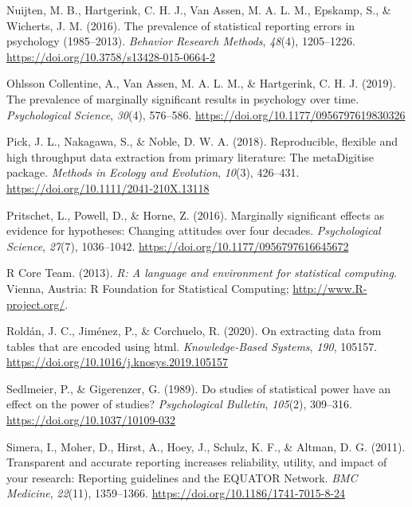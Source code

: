 \documentclass[
  12pt,
]{article}
\begin{document}
\leavevmode\hypertarget{ref-Nuijten2016}{}%
Nuijten, M. B., Hartgerink, C. H. J., Van Assen, M. A. L. M., Epskamp,
S., \& Wicherts, J. M. (2016). The prevalence of statistical reporting
errors in psychology (1985--2013). \emph{Behavior Research Methods},
\emph{48}(4), 1205--1226.
\url{https://doi.org/10.3758/s13428-015-0664-2}

\leavevmode\hypertarget{ref-OhlssonCollentine}{}%
Ohlsson Collentine, A., Van Assen, M. A. L. M., \& Hartgerink, C. H. J.
(2019). The prevalence of marginally significant results in psychology
over time. \emph{Psychological Science}, \emph{30}(4), 576--586.
\url{https://doi.org/10.1177/0956797619830326}

\leavevmode\hypertarget{ref-Pick}{}%
Pick, J. L., Nakagawa, S., \& Noble, D. W. A. (2018). Reproducible,
flexible and high throughput data extraction from primary literature:
The metaDigitise package. \emph{Methods in Ecology and Evolution},
\emph{10}(3), 426--431. \url{https://doi.org/10.1111/2041-210X.13118}

\leavevmode\hypertarget{ref-Pritschet}{}%
Pritschet, L., Powell, D., \& Horne, Z. (2016). Marginally significant
effects as evidence for hypotheses: Changing attitudes over four
decades. \emph{Psychological Science}, \emph{27}(7), 1036--1042.
\url{https://doi.org/10.1177/0956797616645672}

\leavevmode\hypertarget{ref-Rstats}{}%
R Core Team. (2013). \emph{R: A language and environment for statistical
computing}. Vienna, Austria: R Foundation for Statistical Computing;
\url{http://www.R-project.org/}.

\leavevmode\hypertarget{ref-Roldan}{}%
Roldán, J. C., Jiménez, P., \& Corchuelo, R. (2020). On extracting data
from tables that are encoded using html. \emph{Knowledge-Based Systems},
\emph{190}, 105157. \url{https://doi.org/10.1016/j.knosys.2019.105157}

\leavevmode\hypertarget{ref-Sedlmeier}{}%
Sedlmeier, P., \& Gigerenzer, G. (1989). Do studies of statistical power
have an effect on the power of studies? \emph{Psychological Bulletin},
\emph{105}(2), 309--316. \url{https://doi.org/10.1037/10109-032}

\leavevmode\hypertarget{ref-Simera}{}%
Simera, I., Moher, D., Hirst, A., Hoey, J., Schulz, K. F., \& Altman, D.
G. (2011). Transparent and accurate reporting increases reliability,
utility, and impact of your research: Reporting guidelines and the
EQUATOR Network. \emph{BMC Medicine}, \emph{22}(11), 1359--1366.
\url{https://doi.org/10.1186/1741-7015-8-24}
\end{document}
